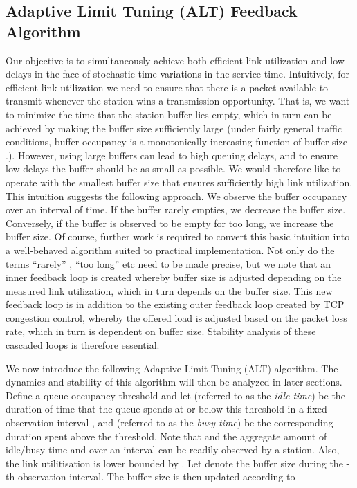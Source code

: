 \documentclass[10pt,twocolumn, journal]{IEEEtran}
\def\DLaddition#1{\noindent\ {\color{black} #1}}
\begin{document}
\subsection{Adaptive Limit Tuning (ALT) Feedback Algorithm}

Our objective is to simultaneously achieve both efficient link utilization and low delays in the face of stochastic time-variations in the service time.  Intuitively, for efficient link utilization we need to ensure that there is a packet available to transmit whenever the station wins a transmission opportunity.  That is, we want to minimize the time that the station buffer lies empty, which in turn can be achieved by making the buffer size sufficiently large (under fairly general traffic conditions, buffer occupancy is a monotonically increasing function of buffer size \cite{Kumaran_stolyer_2003}.).   However, using large buffers can lead to high queuing delays, and to ensure low delays the buffer should be as small as possible.   We would therefore like to operate with the smallest buffer size that ensures sufficiently high link utilization.  This intuition suggests the following approach. We observe the buffer occupancy over an interval of time. If the buffer rarely empties, we decrease the buffer size. Conversely, if the buffer is observed to be empty for too long, we increase the buffer size.    Of course, further work is required to convert this basic intuition into a well-behaved algorithm suited to practical implementation.   Not only do the terms ``rarely'' , ``too long'' etc need to be made precise, but we note that an inner feedback loop is created whereby buffer size is adjusted depending on the measured link utilization, which in turn depends on the buffer size.   This new feedback loop is in addition to the existing outer feedback loop created by TCP congestion control, whereby the offered load is adjusted based on the packet loss rate, which in turn is dependent on buffer size.   Stability analysis of these cascaded loops is therefore essential.

We now introduce the following Adaptive Limit Tuning (ALT) algorithm.  The dynamics and stability of this algorithm will then be analyzed in later sections. \DLaddition{Define a queue occupancy threshold  and let  (referred to as the \emph{idle time}) be the duration of time that the queue spends at or below this threshold in a fixed observation interval , and  (referred to as the \emph{busy time}) be the corresponding duration spent above the threshold.  Note that  and the aggregate amount of idle/busy time  and  over an interval can be readily observed by a station.  Also, the link utilitisation is lower bounded by .  Let  denote the buffer size during the -th observation interval.}  The buffer size is then updated according to
\end{document}
